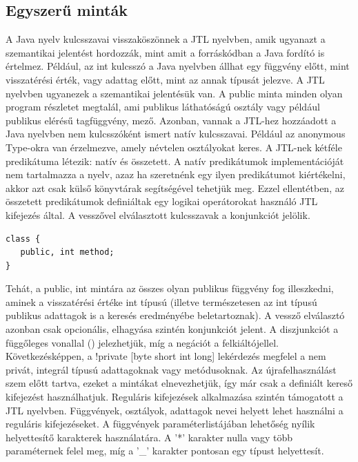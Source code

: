 \documentclass[a4paper,12pt]{report}
\begin{document}
\subsection{Egyszerű minták}
\par A Java nyelv kulcsszavai visszaköszönnek a JTL nyelvben, amik ugyanazt a szemantikai jelentést hordozzák, mint amit a forráskódban a Java fordító is értelmez. Például, az int kulcsszó a Java nyelvben állhat egy függvény előtt, mint visszatérési érték, vagy adattag előtt, mint az annak típusát jelezve. A JTL nyelvben ugyanezek a szemantikai jelentésük van. A public minta minden olyan program részletet megtalál, ami publikus láthatóságú osztály vagy például publikus elérésű tagfüggvény, mező. Azonban, vannak a JTL-hez hozzáadott a Java nyelvben nem kulcsszóként ismert natív kulcsszavai. Például az anonymous Type-okra van érzelmezve, amely névtelen osztályokat keres. A JTL-nek kétféle predikátuma létezik: natív és összetett. A natív predikátumok implementációját nem tartalmazza a nyelv, azaz ha szeretnénk egy ilyen predikátumot kiértékelni, akkor azt csak külső könyvtárak segítségével tehetjük meg. Ezzel ellentétben, az összetett predikátumok definiáltak egy logikai operátorokat használó JTL kifejezés által. A vesszővel elválasztott kulcsszavak a konjunkciót jelölik. 
\begin{verbatim}
class {
   public, int method;
}
\end{verbatim}
Tehát, a public, int mintára az összes olyan publikus függvény fog illeszkedni, aminek a visszatérési értéke int típusú (illetve természetesen az int típusú publikus adattagok is a keresés eredményébe beletartoznak). A vessző elválasztó azonban csak opcionális, elhagyása szintén konjunkciót jelent. A diszjunkciót a függőleges vonallal (\textpipe) jelezhetjük, míg a negációt a felkiáltójellel. Következésképpen, a !private [byte \textpipe{} short \textpipe{} int \textpipe{} long] lekérdezés megfelel a nem privát, integrál típusú adattagoknak vagy metódusoknak. Az újrafelhasználást szem előtt tartva, ezeket a mintákat elnevezhetjük, így már csak a definiált kereső kifejezést használhatjuk. Reguláris kifejezések alkalmazása szintén támogatott a JTL nyelvben. Függvények, osztályok, adattagok nevei helyett lehet használni a reguláris kifejezéseket. A függvények paraméterlistájában lehetőség nyílik helyettesítő karakterek használatára. A ’*’ karakter nulla vagy több paraméternek felel meg, míg a ’\_’ karakter pontosan egy típust helyettesít.
\end{document}
